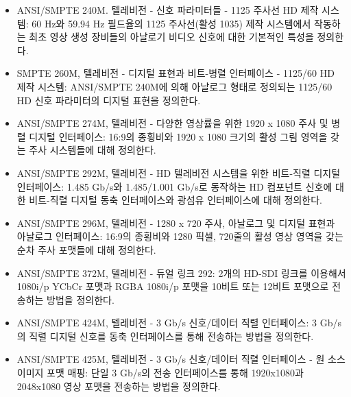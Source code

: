 \begin{itemize}
    \item ANSI/SMPTE 240M. 텔레비전 - 신호 파라미터들 - 1125 주사선 HD 제작 시스템: 60 Hz와 59.94 Hz 필드율의 1125 주사선(활성 1035) 제작 시스템에서 작동하는 최초 영상 생성 장비들의 아날로기 비디오 신호에 대한 기본적인 특성을 정의한다.
    \item SMPTE 260M, 텔레비전 - 디지털 표현과 비트-병렬 인터페이스 - 1125/60 HD 제작 시스템: ANSI/SMPTE 240M에 의해 아날로그 형태로 정의되는 1125/60 HD 신호 파라미터의 디지털 표현을 정의한다.
    \item ANSI/SMPTE 274M, 텔레비전 - 다양한 영상률을 위한 1920 x 1080 주사 및 병렬 디지털 인터페이스: 16:9의 종횡비와 1920 x 1080 크기의 활성 그림 영역을 갖는 주사 시스템들에 대해 정의한다.
    \item ANSI/SMPTE 292M, 텔레비전 - HD 텔레비전 시스템을 위한 비트-직렬 디지털 인터페이스: 1.485 Gb/s와 1.485/1.001 Gb/s로 동작하는 HD 컴포넌트 신호에 대한 비트-직렬 디지털 동축 인터페이스와 광섬유 인터페이스에 대해 정의한다.
    \item ANSI/SMPTE 296M, 텔레비전 - 1280 x 720 주사, 아날로그 및 디지털 표현과 아날로그 인터페이스: 16:9의 종횡비와 1280 픽셀, 720줄의 활성 영상 영역을 갖는 순차 주사 포맷들에 대해 정의한다.
    \item ANSI/SMPTE 372M, 텔레비전 - 듀얼 링크 292: 2개의 HD-SDI 링크를 이용해서 1080i/p YCbCr 포맷과 RGBA 1080i/p 포맷을 10비트 또는 12비트 포맷으로 전송하는 방법을 정의한다.
    \item ANSI/SMPTE 424M, 텔레비전 - 3 Gb/s 신호/데이터 직렬 인터페이스: 3 Gb/s의 직렬 디지털 신호를 동축 인터페이스를 통해 전송하는 방법을 정의한다.
    \item ANSI/SMPTE 425M, 텔레비전 - 3 Gb/s 신호/데이터 직렬 인터페이스 - 원 소스 이미지 포맷 매핑: 단일 3 Gb/s의 전송 인터페이스를 통해 1920x1080과 2048x1080 영상 포맷을 전송하는 방법을 정의한다.
\end{itemize}